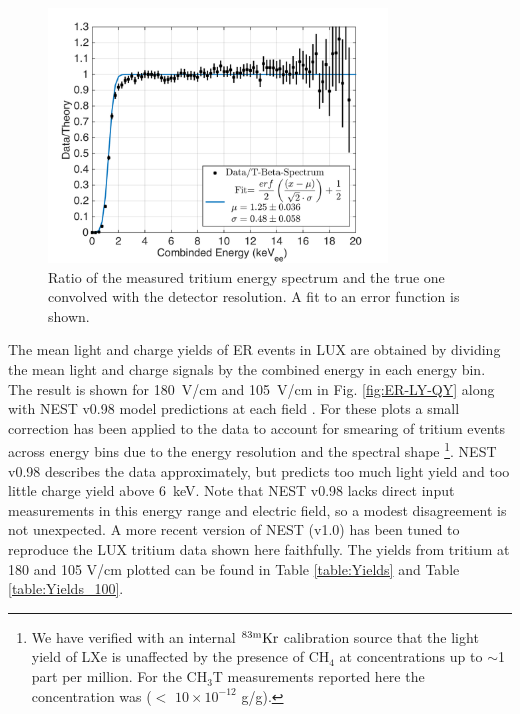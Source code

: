 \begin{figure}[h!]
\includegraphics[width=90mm]{fig/E_Thres_Fit.png}
\caption{Ratio of the measured tritium energy spectrum and the true one convolved with the detector resolution. A fit to an error function is shown.}
\label{fig:ER-threshold}
\end{figure}


The mean light and charge yields of ER events in LUX are obtained by dividing the mean light and charge signals by the combined energy in each energy bin. The result is shown for 180~V/cm and 105~V/cm in Fig. \ref{fig:ER-LY-QY} along with NEST v0.98 model predictions at each field \cite{NEST_2013}. For these plots a small correction has been applied to the data to account for smearing of tritium events across energy bins due to the energy resolution and the spectral shape \cite{Dobi_Thesis}\footnote{We have verified with an internal $\rm ^{83m}Kr$ calibration source that the light yield of LXe is unaffected by the presence of CH$_4$ at concentrations up to $\sim$1 part per million. For the CH$_3$T measurements reported here the concentration was ($<$ $10\times10^{-12}$ g/g). }.  NEST v0.98 describes the data approximately, but predicts too much light yield and too little charge yield above 6~keV. Note that NEST v0.98 lacks direct input measurements in this energy range and electric field, so a modest disagreement is not unexpected. A more recent version of NEST (v1.0) has been tuned to reproduce the LUX tritium data shown here faithfully. The yields from tritium at 180 and 105 V/cm plotted can be found in Table \ref{table:Yields} and Table \ref{table:Yields_100}.

